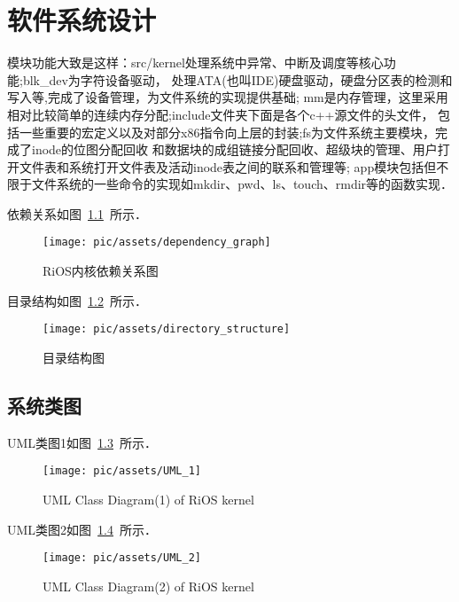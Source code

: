 \chapter{软件系统设计} 
模块功能大致是这样：src/kernel处理系统中异常、中断及调度等核心功能;blk\_dev为字符设备驱动，
处理ATA(也叫IDE)硬盘驱动，硬盘分区表的检测和写入等,完成了设备管理，为文件系统的实现提供基础;
mm是内存管理，这里采用相对比较简单的连续内存分配;include文件夹下面是各个c++源文件的头文件，
包括一些重要的宏定义以及对部分x86指令向上层的封装;fs为文件系统主要模块，完成了inode的位图分配回收
和数据块的成组链接分配回收、超级块的管理、用户打开文件表和系统打开文件表及活动inode表之间的联系和管理等;
app模块包括但不限于文件系统的一些命令的实现如mkdir、pwd、ls、touch、rmdir等的函数实现．


依赖关系如图~\ref{dependency_graph}~所示．	

\begin{figure}[!htbp]
		\centering	\texttt{[image: pic/assets/dependency\_graph]}
		\caption{RiOS内核依赖关系图}	\label{dependency_graph}	\end{figure}


目录结构如图~\ref{directory_structure}~所示．	

     \begin{figure}[!htbp]
            \centering	\texttt{[image: pic/assets/directory\_structure]}
            \caption{目录结构图}	\label{directory_structure}	\end{figure}

\section{系统类图}            

UML类图1如图~\ref{UML_1}~所示．	

     \begin{figure}[!htbp]
            \centering	\texttt{[image: pic/assets/UML\_1]}
            \caption{UML Class Diagram(1) of RiOS kernel}	\label{UML_1}	\end{figure}

UML类图2如图~\ref{UML_2}~所示．	

     \begin{figure}[!htbp]
            \centering	\texttt{[image: pic/assets/UML\_2]}
            \caption{UML Class Diagram(2) of RiOS kernel}	\label{UML_2}	\end{figure}

